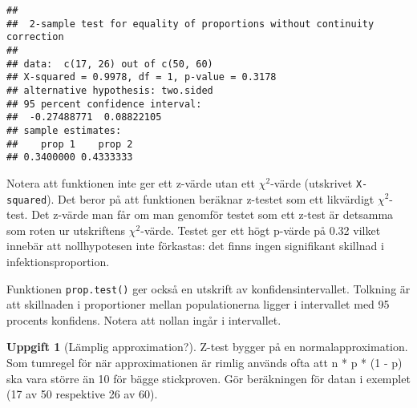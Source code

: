 \documentclass[
]{book}
\theoremstyle{definition}
\theoremstyle{definition}
\theoremstyle{definition}
\newtheorem{exercise}{Uppgift}[chapter]
\theoremstyle{definition}
\theoremstyle{remark}
\begin{document}
\begin{verbatim}
## 
##  2-sample test for equality of proportions without continuity correction
## 
## data:  c(17, 26) out of c(50, 60)
## X-squared = 0.9978, df = 1, p-value = 0.3178
## alternative hypothesis: two.sided
## 95 percent confidence interval:
##  -0.27488771  0.08822105
## sample estimates:
##    prop 1    prop 2 
## 0.3400000 0.4333333
\end{verbatim}

Notera att funktionen inte ger ett z-värde utan ett \(\chi^2\)-värde (utskrivet \texttt{X-squared}). Det beror på att funktionen beräknar z-testet som ett likvärdigt \(\chi^2\)-test. Det z-värde man får om man genomför testet som ett z-test är detsamma som roten ur utskriftens \(\chi^2\)-värde. Testet ger ett högt p-värde på 0.32 vilket innebär att nollhypotesen inte förkastas: det finns ingen signifikant skillnad i infektionsproportion.

Funktionen \texttt{prop.test()} ger också en utskrift av konfidensintervallet. Tolkning är att skillnaden i proportioner mellan populationerna ligger i intervallet med 95 procents konfidens. Notera att nollan ingår i intervallet.

\begin{exercise}[Lämplig approximation?]
Z-test bygger på en normalapproximation. Som tumregel för när approximationen är rimlig används ofta att n * p * (1 - p) ska vara större än 10 för bägge stickproven. Gör beräkningen för datan i exemplet (17 av 50 respektive 26 av 60).
\end{exercise}
\end{document}
